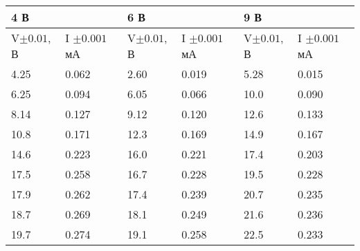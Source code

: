 \begin{table}[]
    \centering
    \begin{tabular}{|ll|ll|ll|}
    \hline
    \multicolumn{2}{|l|}{4 В}                                      & \multicolumn{2}{l|}{6 В}                                     & \multicolumn{2}{l|}{9 В}                                     \\ \hline
    \multicolumn{1}{|l|}{V$\pm 0.01$, В}    & I $\pm 0.001$ мА     & \multicolumn{1}{l|}{V$\pm 0.01$, В}    & I $\pm 0.001$ мА    & \multicolumn{1}{l|}{V$\pm 0.01$, В}    & I $\pm 0.001$ мА    \\ \hline
    \multicolumn{1}{|l|}{4.25}              & 0.062                & \multicolumn{1}{l|}{2.60}              & 0.019               & \multicolumn{1}{l|}{5.28}              & 0.015               \\ \hline
    \multicolumn{1}{|l|}{6.25}              & 0.094                & \multicolumn{1}{l|}{6.05}              & 0.066               & \multicolumn{1}{l|}{10.0}              & 0.090               \\ \hline
    \multicolumn{1}{|l|}{8.14}              & 0.127                & \multicolumn{1}{l|}{9.12}              & 0.120               & \multicolumn{1}{l|}{12.6}              & 0.133               \\ \hline
    \multicolumn{1}{|l|}{10.8}              & 0.171                & \multicolumn{1}{l|}{12.3}              & 0.169               & \multicolumn{1}{l|}{14.9}              & 0.167               \\ \hline
    \multicolumn{1}{|l|}{14.6}              & 0.223                & \multicolumn{1}{l|}{16.0}              & 0.221               & \multicolumn{1}{l|}{17.4}              & 0.203               \\ \hline
    \multicolumn{1}{|l|}{17.5}              & 0.258                & \multicolumn{1}{l|}{16.7}              & 0.228               & \multicolumn{1}{l|}{19.5}              & 0.228               \\ \hline
    \multicolumn{1}{|l|}{17.9}              & 0.262                & \multicolumn{1}{l|}{17.4}              & 0.239               & \multicolumn{1}{l|}{20.7}              & 0.235               \\ \hline
    \multicolumn{1}{|l|}{18.7}              & 0.269                & \multicolumn{1}{l|}{18.1}              & 0.249               & \multicolumn{1}{l|}{21.6}              & 0.236               \\ \hline
    \multicolumn{1}{|l|}{19.7}              & 0.274                & \multicolumn{1}{l|}{19.1}              & 0.258               & \multicolumn{1}{l|}{22.5}              & 0.233               \\ \hline

\end{tabular}
\end{table}

